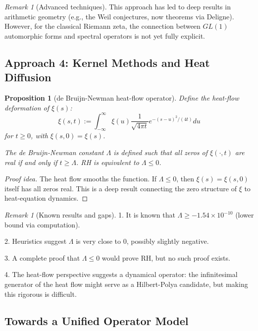\documentclass[11pt]{article}
\theoremstyle{plain}
\newtheorem{proposition}[theorem]{Proposition}
\theoremstyle{definition}
\theoremstyle{remark}
\newtheorem{remark}[theorem]{Remark}
\begin{document}
\begin{remark}[Advanced techniques]
This approach has led to deep results in arithmetic geometry (e.g., the Weil conjectures, now theorems via Deligne).
However, for the classical Riemann zeta, the connection between $GL(1)$ automorphic forms and spectral operators
is not yet fully explicit.
\end{remark}

\subsection{Approach 4: Kernel Methods and Heat Diffusion}

\begin{proposition}[de Bruijn-Newman heat-flow operator]
Define the heat-flow deformation of $\xi(s)$:
\[
\xi(s,t) := \int_{-\infty}^{\infty} \xi(u) \frac{1}{\sqrt{4\pi t}} e^{-(s-u)^2/(4t)} du
\]
for $t\ge 0$, with $\xi(s,0)=\xi(s)$.

The de Bruijn-Newman constant $\Lambda$ is defined such that all zeros of $\xi(\cdot, t)$ are real if and only if $t\ge\Lambda$.
RH is equivalent to $\Lambda\le 0$.
\end{proposition}

\begin{proof}[Proof idea]
The heat flow smooths the function. If $\Lambda\le 0$, then $\xi(s)=\xi(s,0)$ itself has all zeros real.
This is a deep result connecting the zero structure of $\xi$ to heat-equation dynamics.
\end{proof}

\begin{remark}[Known results and gaps]
1. It is known that $\Lambda\ge -1.54 \times 10^{-10}$ (lower bound via computation).

2. Heuristics suggest $\Lambda$ is very close to 0, possibly slightly negative.

3. A complete proof that $\Lambda\le 0$ would prove RH, but no such proof exists.

4. The heat-flow perspective suggests a dynamical operator: the infinitesimal generator of the heat flow
might serve as a Hilbert-Polya candidate, but making this rigorous is difficult.
\end{remark}

\subsection{Towards a Unified Operator Model}
\end{document}

